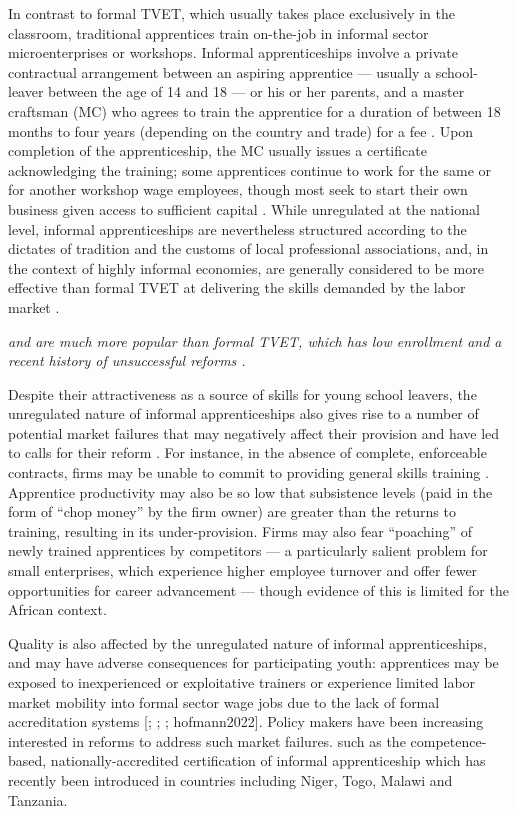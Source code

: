 \documentclass[
  a4paper, twoside, 12pt]{book}
\begin{document}
In contrast to formal TVET, which usually takes place exclusively in the classroom, traditional apprentices train on-the-job in informal sector microenterprises or workshops. Informal apprenticeships involve a private contractual arrangement between an aspiring apprentice --- usually a school-leaver between the age of 14 and 18 --- or his or her parents, and a master craftsman (MC) who agrees to train the apprentice for a duration of between 18 months to four years (depending on the country and trade) for a fee \autocite{hofmann2022}. Upon completion of the apprenticeship, the MC usually issues a certificate acknowledging the training; some apprentices continue to work for the same or for another workshop wage employees, though most seek to start their own business given access to sufficient capital \autocite{frazer2006}. While unregulated at the national level, informal apprenticeships are nevertheless structured according to the dictates of tradition and the customs of local professional associations, and, in the context of highly informal economies, are generally considered to be more effective than formal TVET at delivering the skills demanded by the labor market \autocite{ahadzie2009,africanunion2018,mayombe2021,allais2022}.

\emph{and are much more popular than formal TVET, which has low enrollment and a recent history of unsuccessful reforms \autocite{allais2022}.}

Despite their attractiveness as a source of skills for young school leavers, the unregulated nature of informal apprenticeships also gives rise to a number of potential market failures that may negatively affect their provision and have led to calls for their reform \autocite{walther2011}. For instance, in the absence of complete, enforceable contracts, firms may be unable to commit to providing general skills training \autocite{acemoglu1998,acemoglu1999,dustmann2012}. Apprentice productivity may also be so low that subsistence levels (paid in the form of ``chop money'' by the firm owner) are greater than the returns to training, resulting in its under-provision. Firms may also fear ``poaching'' of newly trained apprentices by competitors --- a particularly salient problem for small enterprises, which experience higher employee turnover and offer fewer opportunities for career advancement \autocite{mcintosh2011} --- though evidence of this is limited for the African context.

Quality is also affected by the unregulated nature of informal apprenticeships, and may have adverse consequences for participating youth: apprentices may be exposed to inexperienced or exploitative trainers or experience limited labor market mobility into formal sector wage jobs due to the lack of formal accreditation systems {[}\textcite{acemoglu2000}; \textcite{worldbank2018}; \textcite{alfonsi2020}; hofmann2022{]}. Policy makers have been increasing interested in reforms to address such market failures. such as the competence-based, nationally-accredited certification of informal apprenticeship which has recently been introduced in countries including Niger, Togo, Malawi and Tanzania.
\end{document}
